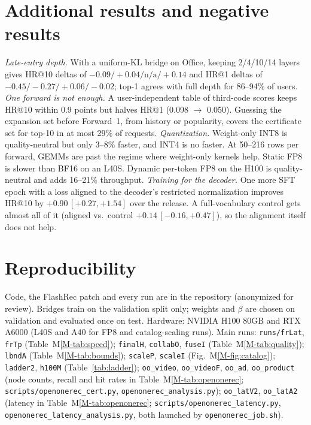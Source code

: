 \documentclass[sigconf,anonymous]{acmart}
\begin{document}
\section{Additional results and negative results}
\label{app:extra}
\emph{Late-entry depth.} With a uniform-KL bridge on Office, keeping 2/4/10/14 layers gives HR@10 deltas of
$-0.09/+0.04/\text{n/a}/+0.14$ and HR@1 deltas of $-0.45/-0.27/+0.06/-0.02$; top-1 agrees with full depth for 86--94\% of
users.
\emph{One forward is not enough.} A user-independent table of third-code scores keeps HR@10 within 0.9 points
but halves HR@1 (0.098 $\to$ 0.050). Guessing the expansion set before Forward~1, from history or popularity,
covers the certificate set for top-10 in at most 29\% of requests.
\emph{Quantization.} Weight-only INT8 is quality-neutral but only 3--8\% faster, and INT4 is no faster. At
50--216 rows per forward, GEMMs are past the regime where weight-only kernels help. Static FP8 is slower than
BF16 on an L40S. Dynamic per-token FP8 on the H100 is quality-neutral and adds 16--21\% throughput.
\emph{Training for the decoder.} One more SFT epoch with a loss aligned to the decoder's restricted normalization
improves HR@10 by $+0.90\,[+0.27,+1.54]$ over the release. A full-vocabulary control gets almost all of it
(aligned vs.\ control $+0.14\,[-0.16,+0.47]$), so the alignment itself does not help.

\section{Reproducibility}
\label{app:repro}
\begin{sloppypar}
Code, the FlashRec patch and every run are in the repository (anonymized for review). Bridges train on the
validation split only; weights and $\beta$ are chosen on validation and evaluated once on test. Hardware: NVIDIA
H100 80GB and RTX A6000 (L40S and A40 for FP8 and catalog-scaling runs). Main runs: \texttt{runs/frLat},
\texttt{frTp} (Table~M\ref{M-tab:speed}); \texttt{finalH}, \texttt{collabO}, \texttt{fuseI} (Table~M\ref{M-tab:quality});
\texttt{lbndA} (Table~M\ref{M-tab:bounds}); \texttt{scaleP}, \texttt{scaleI} (Fig.~M\ref{M-fig:catalog});
\texttt{ladder2}, \texttt{h100M} (Table~\ref{tab:ladder}); \texttt{oo\_video}, \texttt{oo\_videoF},
\texttt{oo\_ad}, \texttt{oo\_product} (node counts, recall and hit rates in Table~M\ref{M-tab:openonerec};
\texttt{scripts/openonerec\_cert.py}, \texttt{openonerec\_analysis.py}); \texttt{oo\_latV2}, \texttt{oo\_latA2}
(latency in Table~M\ref{M-tab:openonerec}; \texttt{scripts/openonerec\_latency.py},
\texttt{openonerec\_latency\_analysis.py}, both launched by \texttt{openonerec\_job.sh}).
\end{sloppypar}




\end{document}
